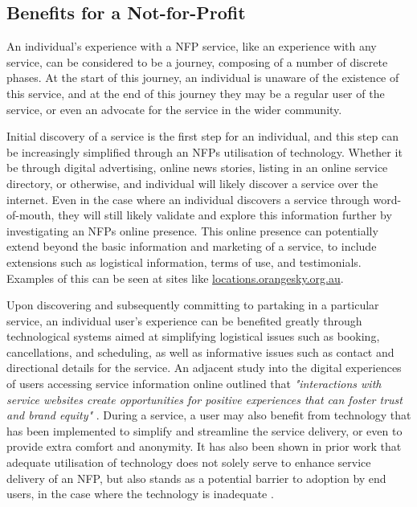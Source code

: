 \subsection{Benefits for a Not-for-Profit}

An individual's experience with a NFP service, like an experience with any service, can be considered to be a journey, composing of a number of discrete phases. At the start of this journey, an individual is unaware of the existence of this service, and at the end of this journey they may be a regular user of the service, or even an advocate for the service in the wider community.

Initial discovery of a service is the first step for an individual, and this step can be increasingly simplified through an NFPs utilisation of technology. Whether it be through digital advertising, online news stories, listing in an online service directory, or otherwise, and individual will likely discover a service over the internet. Even in the case where an individual discovers a service through word-of-mouth, they will still likely validate and explore this information further by investigating an NFPs online presence. This online presence can potentially extend beyond the basic information and marketing of a service, to include extensions such as logistical information, terms of use, and testimonials. Examples of this can be seen at sites like \url{locations.orangesky.org.au}.

Upon discovering and subsequently committing to partaking in a particular service, an individual user's experience can be benefited greatly through technological systems aimed at simplifying logistical issues such as booking, cancellations, and scheduling, as well as informative issues such as contact and directional details for the service. An adjacent study into the digital experiences of users accessing service information online outlined that \emph{"interactions with service websites create opportunities for positive experiences that can foster trust and brand equity"} \cite{bilgihan2015applying}. During a service, a user may also benefit from technology that has been implemented to simplify and streamline the service delivery, or even to provide extra comfort and anonymity. It has also been shown in prior work that adequate utilisation of technology does not solely serve to enhance service delivery of an NFP, but also stands as a potential barrier to adoption by end users, in the case where the technology is inadequate \cite{walker2002technology}.

